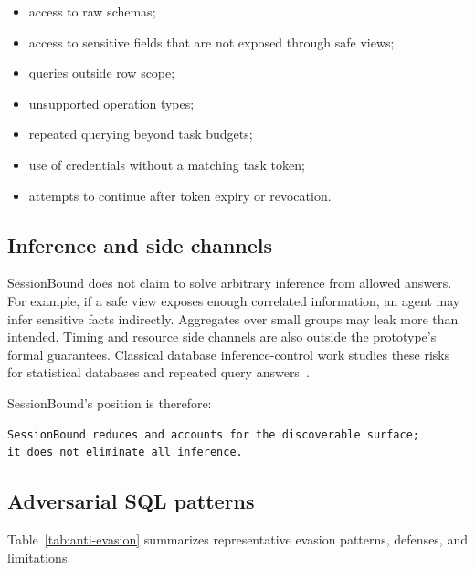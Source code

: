 \documentclass[
]{article}
\providecommand{\tightlist}{%
  \setlength{\itemsep}{0pt}\setlength{\parskip}{0pt}}
\begin{document}
\begin{itemize}
\tightlist
\item
  access to raw schemas;
\item
  access to sensitive fields that are not exposed through safe views;
\item
  queries outside row scope;
\item
  unsupported operation types;
\item
  repeated querying beyond task budgets;
\item
  use of credentials without a matching task token;
\item
  attempts to continue after token expiry or revocation.
\end{itemize}

\hypertarget{inference-and-side-channels}{%
\subsection{Inference and side
channels}\label{inference-and-side-channels}}

SessionBound does not claim to solve arbitrary inference from allowed
answers. For example, if a safe view exposes enough correlated
information, an agent may infer sensitive facts indirectly. Aggregates
over small groups may leak more than intended. Timing and resource side
channels are also outside the prototype's formal guarantees.
Classical database inference-control work studies these risks for
statistical databases and repeated query answers~\cite{adam1989securitycontrol}.

SessionBound's position is therefore:

\begin{verbatim}
SessionBound reduces and accounts for the discoverable surface;
it does not eliminate all inference.
\end{verbatim}

\hypertarget{adversarial-sql-patterns}{%
\subsection{Adversarial SQL
patterns}\label{adversarial-sql-patterns}}

Table~\ref{tab:anti-evasion} summarizes representative evasion
patterns, defenses, and limitations.
\end{document}
